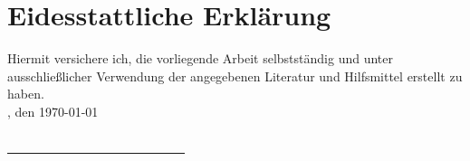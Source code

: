 \chapter{Eidesstattliche Erkl\"arung}
\label{ch:erklaerung}

Hiermit versichere ich, die vorliegende Arbeit selbstständig und unter
ausschließlicher Verwendung der angegebenen Literatur und Hilfsmittel erstellt zu haben.
\vspace*{2em}
\\
\myLocation, den \today \\\\

\underline{\ \ \ \ \ \ \ \ \ \ \ \ \ \ \ \ \ \ \ \ \ \ \ \ \ \ \ \ }\\\\
\small{\myName}
